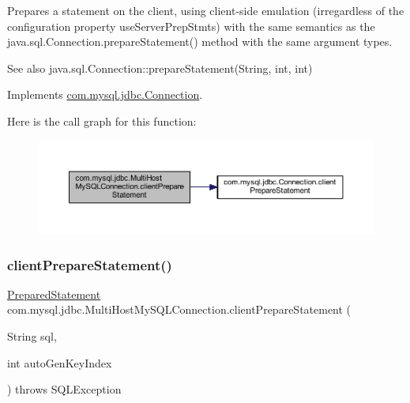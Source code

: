 Prepares a statement on the client, using client-\/side emulation (irregardless of the configuration property \textquotesingle{}use\+Server\+Prep\+Stmts\textquotesingle{}) with the same semantics as the java.\+sql.\+Connection.\+prepare\+Statement() method with the same argument types.

\begin{DoxySeeAlso}{See also}
java.\+sql.\+Connection\+::prepare\+Statement(\+String, int, int) 
\end{DoxySeeAlso}


Implements \mbox{\hyperlink{interfacecom_1_1mysql_1_1jdbc_1_1_connection_a3d058c3722d0afd1cdc4254a9b813c74}{com.\+mysql.\+jdbc.\+Connection}}.

Here is the call graph for this function\+:
\nopagebreak
\begin{figure}[H]
\begin{center}
\leavevmode
\includegraphics[width=350pt]{classcom_1_1mysql_1_1jdbc_1_1_multi_host_my_s_q_l_connection_ad04846601b79203af77929064f64c043_cgraph}
\end{center}
\end{figure}
\mbox{\label{classcom_1_1mysql_1_1jdbc_1_1_multi_host_my_s_q_l_connection_a71d9841bc1d2d9d49980fb98d780c84c}} 
\subsubsection{\texorpdfstring{client\+Prepare\+Statement()}{clientPrepareStatement()}\hspace{0.1cm}{\footnotesize\ttfamily [3/6]}}
{\footnotesize\ttfamily \mbox{\hyperlink{classcom_1_1mysql_1_1jdbc_1_1_prepared_statement}{Prepared\+Statement}} com.\+mysql.\+jdbc.\+Multi\+Host\+My\+S\+Q\+L\+Connection.\+client\+Prepare\+Statement (\begin{DoxyParamCaption}\item[{String}]{sql,  }\item[{int}]{auto\+Gen\+Key\+Index }\end{DoxyParamCaption}) throws S\+Q\+L\+Exception}

